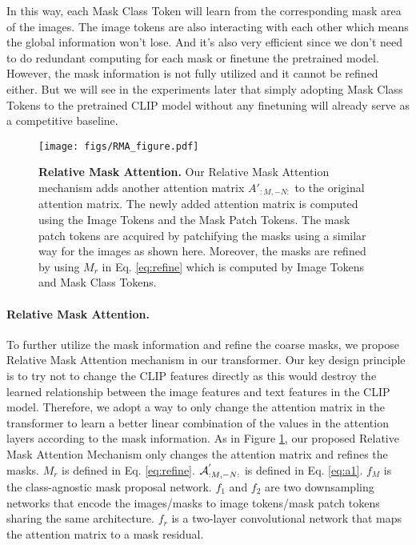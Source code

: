 \documentclass{article}
\theoremstyle{plain}
\theoremstyle{definition}
\theoremstyle{remark}
\begin{document}
In this way, each Mask Class Token will learn from the corresponding mask area of the images. The image tokens are also interacting with each other which means the global information won't lose. And it's also very efficient since we don't need to do redundant computing for each mask or finetune the pretrained model. However, the mask information is not fully utilized and it cannot be refined either. But we will see in the experiments later that simply adopting Mask Class Tokens to the pretrained CLIP model without any finetuning will already serve as a competitive baseline.


\label{sec:rma}

\begin{figure}[!htp]
\begin{center}
\texttt{[image: figs/RMA\_figure.pdf]}
  \caption{\small \textbf{Relative Mask Attention.} Our Relative Mask Attention mechanism adds another attention matrix $A'_{:M, -N:}$ to the original attention matrix. The newly added attention matrix is computed using the Image Tokens and the Mask Patch Tokens. The mask patch tokens are acquired by patchifying the masks using a similar way for the images as shown here. Moreover, the masks are refined by using $M_r$ in Eq. \ref{eq:refine} which is computed by Image Tokens and Mask Class Tokens.} 
\label{fig:rma}
\end{center}
 \end{figure}
\paragraph{Relative Mask Attention.} To further utilize the mask information and refine the coarse masks, we propose Relative Mask Attention mechanism in our transformer. Our key design principle is to try not to change the CLIP features directly as this would destroy the learned relationship between the image features and text features in the CLIP model. Therefore, we adopt a way to only change the attention matrix in the transformer to learn a better linear combination of the values in the attention layers according to the mask information. As in Figure \ref{fig:rma}, our proposed Relative Mask Attention Mechanism only changes the attention matrix and refines the masks. $M_r$ is defined in Eq. \ref{eq:refine}. $\mathcal{A}^{'}_{:M, -N:}$ is defined in Eq. \ref{eq:a1}. $f_M$ is the class-agnostic mask proposal network. $f_1$ and $f_2$ are two downsampling networks that encode the images/masks to image tokens/mask patch tokens sharing the same architecture. $f_r$ is a two-layer convolutional network that maps the attention matrix to a mask residual.
\end{document}
